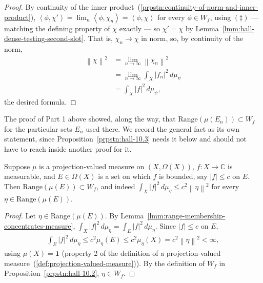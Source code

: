 \begin{proof}
By continuity of the inner product~(\ref{prpstn:continuity-of-norm-and-inner-product}), $\left< \phi, \chi' \right> = \lim_n \left< \phi, \chi_n \right> = \left< \phi, \chi \right>$ for every $\phi \in W_f$, using $(\ddagger)$ — matching the defining property of $\chi$ exactly — so $\chi' = \chi$ by Lemma~\ref{lmm:hall-dense-testing-second-slot}. That is, $\chi_n \to \chi$ in norm, so, by continuity of the norm,
\begin{align}
    \left\| \chi \right\|^2 &= \lim_{n \to \infty} \left\| \chi_n \right\|^2 \\
                &= \lim_{n \to \infty} \int_X \lvert f_n \rvert^2 \, d\mu_\psi \\
                &= \int_X \lvert f \rvert^2 \, d\mu_\psi,
\end{align}
the desired formula.
\end{proof}

The proof of Part 1 above showed, along the way, that $\text{Range}(\mu(E_n)) \subset W_f$ for the particular sets $E_n$ used there. We record the general fact as its own statement, since Proposition~\ref{prpstn:hall-10.3} needs it below and should not have to reach inside another proof for it.

\begin{lemma}
    \label{lmm:bounded-on-set-range-in-domain}
    \leanok
    Suppose $\mu$ is a projection-valued measure on $(X,\Omega(X))$, $f : X \to \mathbb{C}$ is measurable, and $E \in \Omega(X)$ is a set on which $f$ is bounded, say $\lvert f \rvert \le c$ on $E$. Then $\text{Range}(\mu(E)) \subset W_f$, and indeed $\int_X \lvert f \rvert^2\,d\mu_\eta \le c^2 \left\| \eta \right\|^2$ for every $\eta \in \text{Range}(\mu(E))$.
\end{lemma}
\begin{proof}
    \leanok
Let $\eta \in \text{Range}(\mu(E))$. By Lemma~\ref{lmm:range-membership-concentrates-measure}, $\int_X \lvert f \rvert^2 \, d\mu_\eta = \int_E \lvert f \rvert^2 \, d\mu_\eta$. Since $\lvert f \rvert \le c$ on $E$,
\begin{align}
    \int_E \lvert f \rvert^2 \, d\mu_\eta \le c^2 \mu_\eta(E) \le c^2 \mu_\eta(X) = c^2 \left\| \eta \right\|^2 < \infty,
\end{align}
using $\mu(X) = \mathbf{1}$ (property 2 of the definition of a projection-valued measure~(\ref{def:projection-valued-measure})). By the definition of $W_f$ in Proposition~\ref{prpstn:hall-10.2}, $\eta \in W_f$.
\end{proof}

